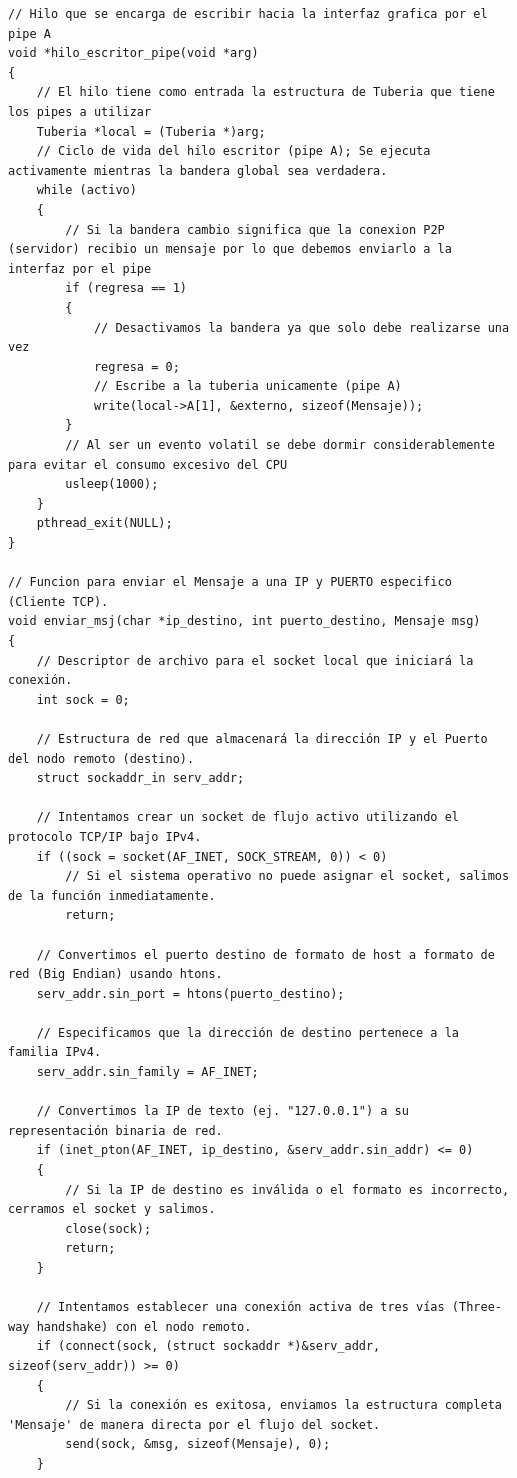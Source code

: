 \begin{lstlisting}[style=estiloC, caption={Archivo del Back-End (conexion P2P)}]
// Hilo que se encarga de escribir hacia la interfaz grafica por el pipe A
void *hilo_escritor_pipe(void *arg)
{
    // El hilo tiene como entrada la estructura de Tuberia que tiene los pipes a utilizar
    Tuberia *local = (Tuberia *)arg;
    // Ciclo de vida del hilo escritor (pipe A); Se ejecuta activamente mientras la bandera global sea verdadera.
    while (activo)
    {
        // Si la bandera cambio significa que la conexion P2P (servidor) recibio un mensaje por lo que debemos enviarlo a la interfaz por el pipe
        if (regresa == 1)
        {
            // Desactivamos la bandera ya que solo debe realizarse una vez
            regresa = 0;
            // Escribe a la tuberia unicamente (pipe A)
            write(local->A[1], &externo, sizeof(Mensaje));
        }
        // Al ser un evento volatil se debe dormir considerablemente para evitar el consumo excesivo del CPU
        usleep(1000);
    }
    pthread_exit(NULL);
}

// Funcion para enviar el Mensaje a una IP y PUERTO especifico (Cliente TCP).
void enviar_msj(char *ip_destino, int puerto_destino, Mensaje msg)
{
    // Descriptor de archivo para el socket local que iniciará la conexión.
    int sock = 0;
    
    // Estructura de red que almacenará la dirección IP y el Puerto del nodo remoto (destino).
    struct sockaddr_in serv_addr;

    // Intentamos crear un socket de flujo activo utilizando el protocolo TCP/IP bajo IPv4.
    if ((sock = socket(AF_INET, SOCK_STREAM, 0)) < 0)
        // Si el sistema operativo no puede asignar el socket, salimos de la función inmediatamente.
        return;

    // Convertimos el puerto destino de formato de host a formato de red (Big Endian) usando htons.
    serv_addr.sin_port = htons(puerto_destino);
    
    // Especificamos que la dirección de destino pertenece a la familia IPv4.
    serv_addr.sin_family = AF_INET;

    // Convertimos la IP de texto (ej. "127.0.0.1") a su representación binaria de red.
    if (inet_pton(AF_INET, ip_destino, &serv_addr.sin_addr) <= 0)
    {
        // Si la IP de destino es inválida o el formato es incorrecto, cerramos el socket y salimos.
        close(sock);
        return;
    }

    // Intentamos establecer una conexión activa de tres vías (Three-way handshake) con el nodo remoto.
    if (connect(sock, (struct sockaddr *)&serv_addr, sizeof(serv_addr)) >= 0)
    {
        // Si la conexión es exitosa, enviamos la estructura completa 'Mensaje' de manera directa por el flujo del socket.
        send(sock, &msg, sizeof(Mensaje), 0);
    }


\end{lstlisting}
